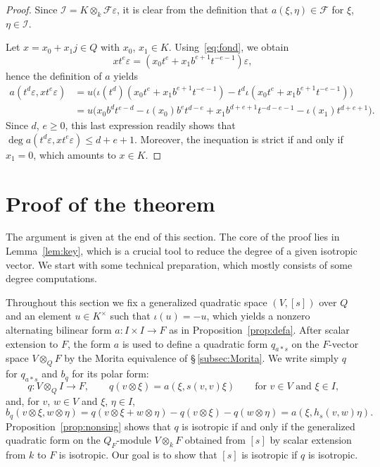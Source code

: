 \documentclass{amsart}
\newcommand{\calI}{\mathcal{I}}
\newcommand{\FQ}{F}
\newcommand{\fq}{\mathcal{F}}
\theoremstyle{remark}
\begin{document}
\begin{proof}
  Since $\calI= K\otimes_k\fq\varepsilon$, it is clear from the
  definition that $a(\xi,\eta)\in\fq$ for $\xi$, $\eta\in\calI$.

  Let $x=x_0+x_1j\in Q$ with $x_0$, $x_1\in K$. Using~\eqref{eq:fond},
  we obtain
  \[
    xt^e\varepsilon = (x_0t^e +
    x_1b^{e+1}t^{-e-1})\varepsilon,
  \]
  hence the definition of $a$ yields
  \begin{align*}
    a(t^d\varepsilon, xt^e\varepsilon)
    & = u\bigl(\iota(t^d)(x_0t^e +
    x_1b^{e+1}t^{-e-1})-t^d\iota(x_0t^e +
    x_1b^{e+1}t^{-e-1})\bigr)
    \\
    & = u\bigl(x_0b^dt^{e-d} - \iota(x_0)b^et^{d-e} +
      x_1b^{d+e+1}t^{-d-e-1} - \iota(x_1)t^{d+e+1}\bigr).
  \end{align*}
  Since $d$, $e\geq0$, this last expression readily shows that $\deg
  a(t^d\varepsilon, xt^e\varepsilon)\leq d+e+1$. Moreover, the
  inequation is strict if and only if $x_1=0$, which amounts to $x\in
  K$. 
\end{proof}

\section{Proof of the theorem}
\label{sec:proof}

The argument is given at the end of this section. The core of the
proof lies in Lemma~\ref{lem:key}, which is a crucial tool to reduce
the degree of a given isotropic vector. We start with some technical
preparation, which mostly consists of some degree computations.

Throughout this section we fix a generalized quadratic space
$(V,[s])$ over $Q$ and an element $u\in K^\times$ such that
$\iota(u)=-u$, which yields a nonzero alternating bilinear form
$a\colon I\times I\to F$ as in Proposition~\ref{prop:defa}. After
scalar extension to $F$, the form $a$ is used to define a quadratic
form $q_{a*s}$ on the $F$-vector space $V\otimes_QF$ by the Morita
equivalence of \S\,\ref{subsec:Morita}. We write simply $q$ for
$q_{a*s}$ and $b_q$ for its polar form:
\[
  q\colon V\otimes_QI\to F, \qquad q(v\otimes\xi) = a(\xi,s(v,v)\xi)
  \qquad\text{for $v\in V$ and $\xi\in I$,}
\]
and, for $v$, $w\in V$ and $\xi$, $\eta\in I$,
\[
  b_q(v\otimes\xi, w\otimes\eta) = q(v\otimes\xi+w\otimes\eta) -
  q(v\otimes\xi) - q(w\otimes\eta) = a(\xi,h_s(v,w)\eta).
\]
Proposition~\ref{prop:nonsing} shows that $q$ is isotropic if and only
if the generalized quadratic form on the $Q_\FQ$-module
$V\otimes_k\FQ$ 
obtained from $[s]$ by scalar extension from $k$ to $F$ is
isotropic. Our goal is to show that $[s]$ is isotropic if $q$ is
isotropic.
\medbreak
\end{document}
